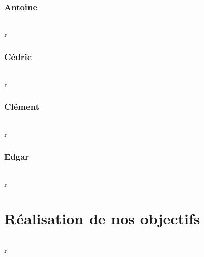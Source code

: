 \documentclass[titlepage, 13px, a4paper]{report}
\begin{document}
\newpage
\section{Antoine}
\paragraph{} \hspace{0pt}
r

\newpage
\section{Cédric}
\paragraph{} \hspace{0pt}
r

\newpage
\section{Clément}
\paragraph{} \hspace{0pt}
r

\newpage
\section{Edgar}
\paragraph{} \hspace{0pt}
r


\newpage


\part{Réalisation de nos objectifs}
\paragraph{} \hspace{0pt}
r

\end{document}
